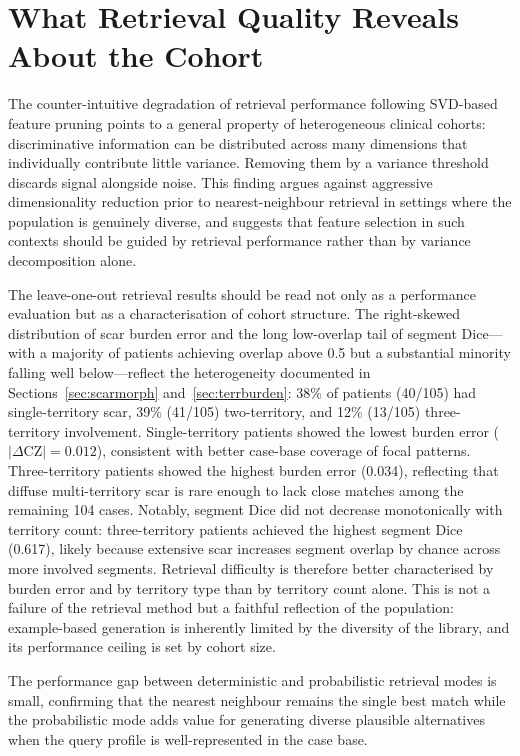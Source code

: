 \section{What Retrieval Quality Reveals About the Cohort}

The counter-intuitive degradation of retrieval performance following SVD-based feature
pruning points to a general property of heterogeneous clinical cohorts: discriminative
information can be distributed across many dimensions that individually contribute little
variance. Removing them by a variance threshold discards signal alongside noise. This
finding argues against aggressive dimensionality reduction prior to nearest-neighbour
retrieval in settings where the population is genuinely diverse, and suggests that feature
selection in such contexts should be guided by retrieval performance rather than by variance
decomposition alone.

The leave-one-out retrieval results should be read not only as a performance evaluation but
as a characterisation of cohort structure. The right-skewed distribution of scar burden error
and the long low-overlap tail of segment Dice---with a majority of patients achieving overlap
above 0.5 but a substantial minority falling well below---reflect the heterogeneity documented
in Sections~\ref{sec:scarmorph} and~\ref{sec:terrburden}: 38\% of patients (40/105)
had single-territory scar, 39\% (41/105) two-territory, and 12\% (13/105) three-territory
involvement. Single-territory patients showed the lowest burden error ($|\Delta\text{CZ}|
= 0.012$), consistent with better case-base coverage of focal patterns. Three-territory
patients showed the highest burden error (0.034), reflecting that diffuse multi-territory scar
is rare enough to lack close matches among the remaining 104 cases. Notably, segment
Dice did not decrease monotonically with territory count: three-territory patients achieved
the highest segment Dice (0.617), likely because extensive scar increases segment overlap
by chance across more involved segments. Retrieval difficulty is therefore better
characterised by burden error and by territory type than by territory count alone. This is not
a failure of the retrieval method but a faithful reflection of the population: example-based
generation is inherently limited by the diversity of the library, and its performance ceiling
is set by cohort size.

The performance gap between deterministic and probabilistic retrieval modes is small,
confirming that the nearest neighbour remains the single best match while the probabilistic
mode adds value for generating diverse plausible alternatives when the query profile is
well-represented in the case base.

